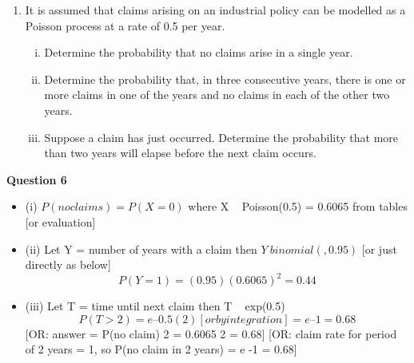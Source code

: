 \documentclass[a4paper,12pt]{article}
\begin{document}
\begin{enumerate}
\item 

It is assumed that claims arising on an industrial policy can be modelled as a Poisson process at a rate of 0.5 per year.

\begin{enumerate}[(i)]
\item Determine the probability that no claims arise in a single year.

\item Determine the probability that, in three consecutive years, there is one or more
claims in one of the years and no claims in each of the other two years.

\item Suppose a claim has just occurred. Determine the probability that more than
two years will elapse before the next claim occurs.
\end{enumerate}


\end{enumerate}
\newpage

\noindent \textbf{Question 6}
\begin{itemize}
\item (i) $P(no claims) = P(X = 0)$ where X ~ Poisson(0.5)
= 0.6065 from tables [or evaluation]
\item (ii) Let Y = number of years with a claim
then $Y ~ binomial(,0.95)$ [or just directly as below]
\[P(Y = 1) = (0.95)(0.6065)^2 = 0.44\]
\item (iii)
Let T = time until next claim
then T ~ exp(0.5)
\[P(T > 2) = e –0.5(2) [or by integration]
= e –1 = 0.68\]
[OR: answer = {P(no claim)} 2 = 0.6065 2 = 0.68]
[OR: claim rate for period of 2 years = 1, so P(no claim in 2 years)
= e -1 = 0.68]
\end{itemize}
\end{document}
